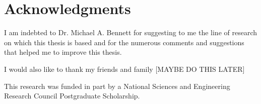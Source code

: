 
\chapter{Acknowledgments}

I am indebted to Dr. Michael A. Bennett for suggesting to me the line of research on which this thesis is based and for the numerous comments and suggestions that helped me to improve this thesis. 

I would also like to thank my friends and family
[MAYBE DO THIS LATER]



This research was funded in part by a National Sciences and Engineering Research Council Postgraduate Scholarship.

\endinput

Thank those people who helped you. 

Don't forget your parents or loved ones.

You may wish to acknowledge your funding sources.
